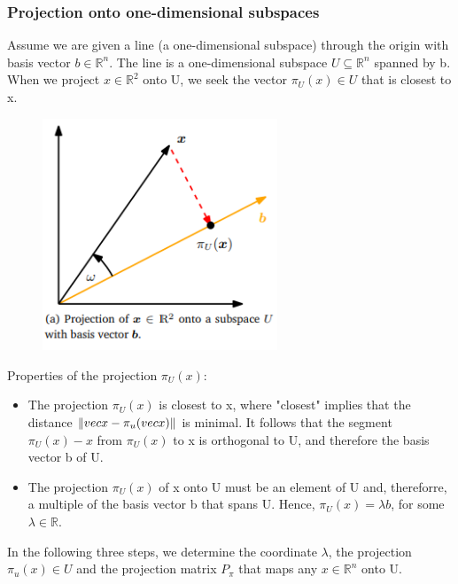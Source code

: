 \subsubsection{Projection onto one-dimensional subspaces}
\begin{definition}
    Assume we are given a line (a one-dimensional subspace) through the origin with basis vector $b\in \mathbb{R}^n$. The line is a one-dimensional subspace $U\subseteq \mathbb{R}^n$ spanned by b. When we project $x \in \mathbb{R}^2$ onto U, we seek the vector $\pi_U(x) \in U$ that is closest to x. 
\end{definition}
\begin{figure}[htbp]
    \centering
    \includegraphics[width = 7cm]{Math/projectin_onto_line.png}
\end{figure}
Properties of the projection $\pi_U(x)$:
\begin{itemize}
    \item The projection $\pi_U(x)$ is closest to x, where "closest" implies that the distance $ \left\lVert vec x - \pi_u(vec x)\right\rVert $ is minimal. It follows that the segment $\pi_U(x) -x$ from $\pi_U(x)$ to x is orthogonal to U, and therefore the basis vector b of U.
    \item The projection $\pi_U(x)$ of x onto U must be an element of U and, thereforre, a multiple of the basis vector b that spans U. Hence, $\pi_U(x) = \lambda b$, for some $\lambda \in \mathbb{R}$.
\end{itemize}
In the following three steps, we determine the coordinate $\lambda$, the projection $\pi_u(x) \in U$ and the projection matrix $P_\pi$ that maps any $x \in \mathbb{R}^n$ onto U.
